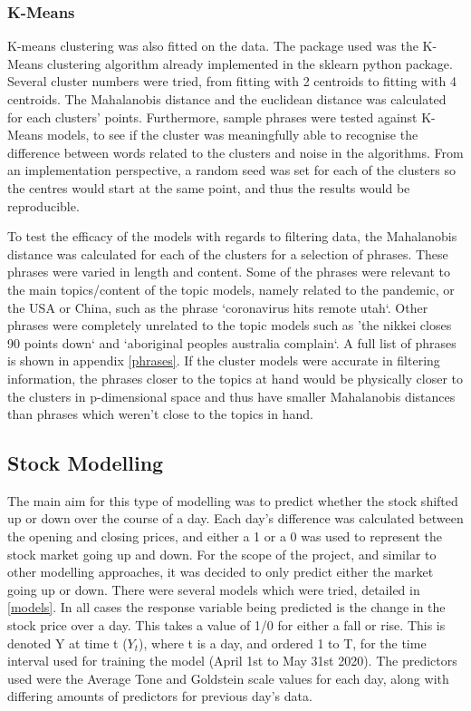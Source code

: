 \subsubsection{K-Means}
K-means clustering was also fitted on the data. The package used was the K-Means clustering algorithm already implemented in the sklearn python package. Several cluster numbers were tried, from fitting with 2 centroids to fitting with 4 centroids. The Mahalanobis distance and the euclidean distance was calculated for each clusters' points. Furthermore, sample phrases were tested against K-Means models, to see if the cluster was meaningfully able to recognise the difference between words related to the clusters and noise in the algorithms. From an implementation perspective, a random seed was set for each of the clusters so the centres would start at the same point, and thus the results would be reproducible. 

To test the efficacy of the models with regards to filtering data, the Mahalanobis distance was calculated for each of the clusters for a selection of phrases. These phrases were varied in length and content. Some of the phrases were relevant to the main topics/content of the topic models,  namely related to the pandemic, or the USA or China, such as the phrase `coronavirus hits remote utah`. Other phrases were completely unrelated to the topic models such as 'the nikkei closes 90 points down` and `aboriginal peoples australia complain`. A full list of phrases is shown in appendix \ref{phrases}. If the cluster models were accurate in filtering information, the phrases closer to the topics at hand would be physically closer to the clusters in p-dimensional space and thus have smaller Mahalanobis distances than phrases which weren't close to the topics in hand.  

\subsection{Stock Modelling}
The main aim for this type of modelling was to predict whether the stock shifted up or down over the course of a day. Each day's difference was calculated between the opening and closing prices, and either a 1 or a 0 was used to represent the stock market going up and down. For the scope of the project, and similar to other modelling approaches, it was decided to only predict either the market going up or down. There were several models which were tried, detailed in \ref{models}. In all cases the response variable being predicted is the change in the stock price over a day. This takes a value of 1/0 for either a fall or rise. This is denoted Y at time t ($Y_{t}$), where t is a day, and ordered 1 to T, for the time interval used for training the model (April 1st to May 31st 2020). The predictors used were the Average Tone and Goldstein scale values for each day, along with differing amounts of predictors for previous day's data.

